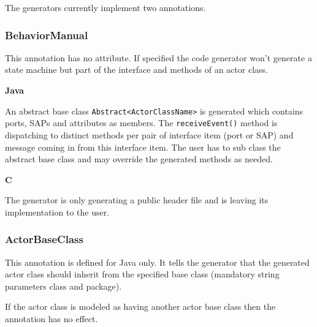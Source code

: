 The \eTrice{} generators currently implement two annotations.

\subsubsection*{BehaviorManual}

This annotation has no attribute. If specified the code generator won't generate a state machine but
part of the interface and methods of an actor class.

\textbf{Java}

An abstract base class \texttt{Abstract<ActorClassName>} is generated which contains ports, SAPs and attributes as members.
The \texttt{receiveEvent()} method is dispatching to distinct methods per pair of interface item (port or SAP) and message
coming in from this interface item. The user has to sub class the abstract base class and may override the
generated methods as needed.

\textbf{C}

The generator is only generating a public header file and is leaving its implementation to the user.

\subsubsection*{ActorBaseClass}

This annotation is defined for Java only. It tells the generator that the generated actor class should
inherit from the specified base class (mandatory string parameters class and package).

If the actor class is modeled as having another actor base class then the annotation has no effect.
